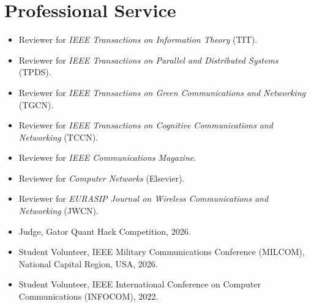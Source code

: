 \documentclass[10pt]{article}
\begin{document}
\section*{Professional Service}
\begin{itemize}
\item Reviewer for \emph{IEEE Transactions on Information Theory} (TIT).
\item Reviewer for \emph{IEEE Transactions on Parallel and Distributed Systems} (TPDS).
\item Reviewer for \emph{IEEE Transactions on Green Communications and Networking} (TGCN).
\item Reviewer for \emph{IEEE Transactions on Cognitive Communications and Networking} (TCCN).
\item Reviewer for \emph{IEEE Communications Magazine}.
\item Reviewer for \emph{Computer Networks} (Elsevier).
\item Reviewer for \emph{EURASIP Journal on Wireless Communications and Networking} (JWCN).
\item Judge, Gator Quant Hack Competition, 2026.
\item Student Volunteer, IEEE Military Communications Conference (MILCOM), National Capital Region, USA, 2026.
\item Student Volunteer, IEEE International Conference on Computer Communications (INFOCOM), 2022.
\end{itemize}
\end{document}
